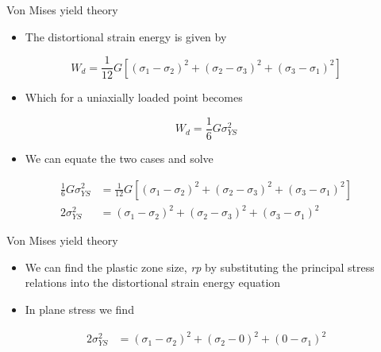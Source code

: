 \documentclass[
  letterpaper,
  ignorenonframetext,
  aspectratio=43,
  handout,
  12pt]{beamer}
\providecommand{\tightlist}{%
  \setlength{\itemsep}{0pt}\setlength{\parskip}{0pt}}
\providecommand{\tightlist}{%
\setlength{\itemsep}{0pt}\setlength{\parskip}{0pt}}
\begin{document}
\begin{frame}{Von Mises yield theory}
\protect\hypertarget{von-mises-yield-theory-1}{}
\begin{itemize}
\tightlist
\item
  The distortional strain energy is given by
\end{itemize}

\[ W_d = \frac{1}{12}G\left[\left(\sigma_1 - \sigma_2\right)^2 + \left(\sigma_2 - \sigma_3\right)^2 +\left(\sigma_3 - \sigma_1\right)^2\right]\]

\begin{itemize}
\tightlist
\item
  Which for a uniaxially loaded point becomes
\end{itemize}

\[W_d = \frac{1}{6}G\sigma_{YS}^2\]

\begin{itemize}
\tightlist
\item
  We can equate the two cases and solve
\end{itemize}

\[\begin{aligned}
  \frac{1}{6}G\sigma_{YS}^2 &= \frac{1}{12}G\left[\left(\sigma_1 - \sigma_2\right)^2 + \left(\sigma_2 - \sigma_3\right)^2 + \left(\sigma_3 - \sigma_1\right)^2\right]\\
  2 \sigma_{YS}^2 &= \left(\sigma_1 - \sigma_2\right)^2 + \left(\sigma_2 - \sigma_3\right)^2 + \left(\sigma_3 - \sigma_1\right)^2
\end{aligned}\]
\end{frame}

\begin{frame}{Von Mises yield theory}
\protect\hypertarget{von-mises-yield-theory-2}{}
\begin{itemize}
\tightlist
\item
  We can find the plastic zone size, \emph{r}\emph{p} by substituting
  the principal stress relations into the distortional strain energy
  equation
\item
  In plane stress we find
\end{itemize}

\[\begin{aligned}
  2 \sigma_{YS}^2 &= \left( \sigma_1 - \sigma_2 \right)^2 + \left( \sigma_2 - 0 \right)^2 + \left(0 - \sigma_1\right)^2
\end{aligned}\]
\end{frame}
\end{document}
